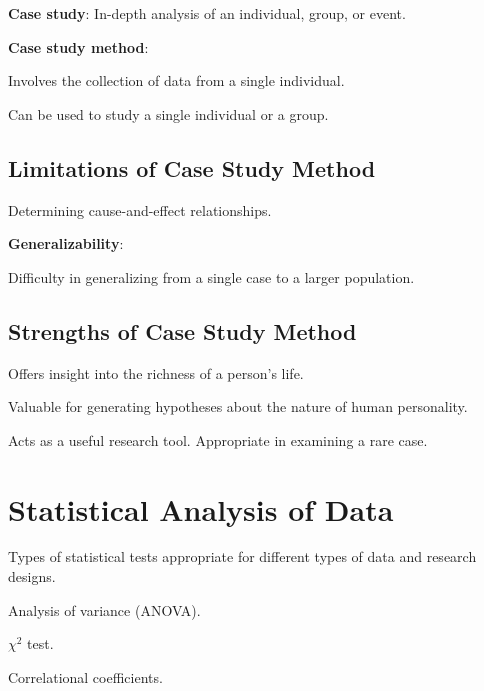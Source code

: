 \begin{coloredlist}
    \item \textbf{Case study}: In-depth analysis of an individual, group, or event.
    \item \textbf{Case study method}:
    \begin{coloredlist}
        \item Involves the collection of data from a single individual.
        \item Can be used to study a single individual or a group.
    \end{coloredlist}
\end{coloredlist}

\subsection{Limitations of Case Study Method}

\begin{coloredlist}
    \item Determining cause-and-effect relationships.
    \item \textbf{Generalizability}:
    \begin{coloredlist}
        \item Difficulty in generalizing from a single case to a larger population.
    \end{coloredlist}
\end{coloredlist}

\subsection{Strengths of Case Study Method}

\begin{coloredlist}
    \item Offers insight into the richness of a person's life.
    \item Valuable for generating hypotheses about the nature of human personality.
    \item Acts as a useful research tool. Appropriate in examining a rare case.
\end{coloredlist}

\section{Statistical Analysis of Data}

\begin{coloredlist}
    \item Types of statistical tests appropriate for different types of data and research designs.
    \begin{coloredlist}
        \item Analysis of variance (ANOVA).
        \item \(\chi^{2}\) test.
        \item Correlational coefficients.
    \end{coloredlist}
\end{coloredlist}

